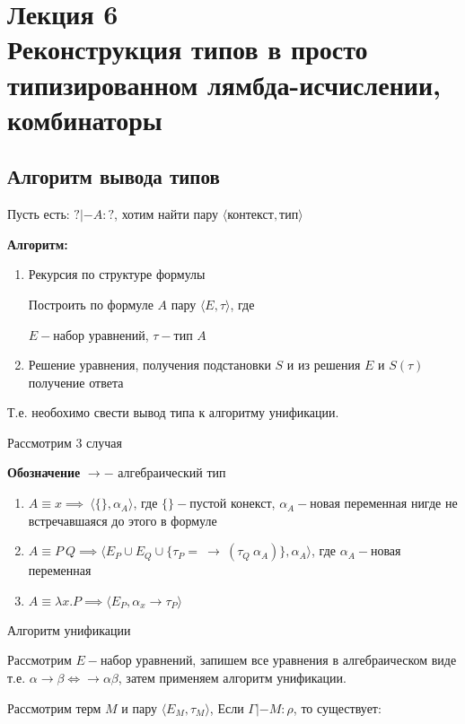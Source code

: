 \section{Лекция 6 \\ Реконструкция типов в просто типизированном лямбда-исчислении, комбинаторы}
		\subsection{Алгоритм вывода типов}
			Пусть есть: $?|-A:?$, хотим найти пару $\big \langle \text{контекст}, \text{тип} \big \rangle$\par
	\textbf{Алгоритм:}
	\begin{enumerate}
		\item Рекурсия по структуре формулы\par Построить по формуле $A$ пару $\big \langle E, \tau\big \rangle$, где\par $E-$набор уравнений, $\tau-$тип $A$
		\item Решение уравнения, получения подстановки $S$ и из решения $E$ и $S(\tau)$ получение ответа	
	\end{enumerate}
		Т.е. необохимо свести вывод типа к алгоритму унификации.\par
		\begin{oun_paragraph}Рассмотрим 3 случая\end{oun_paragraph}
			\textbf{Обозначение } $\rightarrow-$ алгебраический тип 
			\begin{enumerate}
				\item $A\equiv x\implies\:\big \langle \{\}, \alpha_A\big\rangle$, где $\{\}-$пустой конекст, $\alpha_A-$новая переменная нигде не встречавшаяся до этого в формуле
				\item $A\equiv P\:Q\implies\big \langle E_P\cup E_Q\cup \{\tau_P=\:\rightarrow\:(\tau_Q\:\alpha_A)\}, \alpha_A\big \rangle$, где $\alpha_A-$новая переменная
				\item $A\equiv\lambda x.P\implies\big\langle E_P,\alpha_x\rightarrow\tau_P\big\rangle$
			\end{enumerate}
		\begin{oun_paragraph}Алгоритм унификации\end{oun_paragraph} 
			Рассмотрим $E-$набор уравнений, запишем все уравнения в алгебраическом виде т.е. $\alpha\rightarrow\beta\Leftrightarrow\rightarrow\alpha\beta$, затем применяем алгоритм унификации.
	\begin{lemma}
	Рассмотрим терм $M$ и пару $\big\langle E_M, \tau_M\big\rangle$, Если $\Gamma|-M:\rho$, то существует:
	\end{lemma}	
